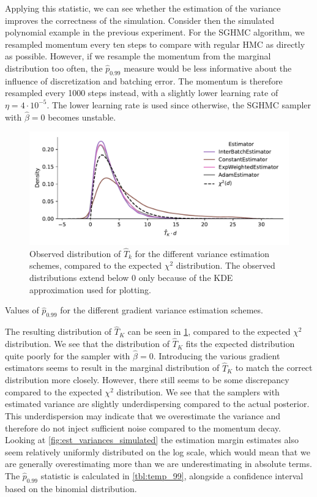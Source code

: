 Applying this statistic, we can see whether the estimation of the variance improves the correctness of the simulation. 
Consider then the simulated polynomial example in the previous experiment.
For the SGHMC algorithm, we resampled momentum every ten steps to compare with regular HMC as directly as possible. 
However, if we resample the momentum from the marginal distribution too often, the $\hat{p}_{0.99}$ measure would be less informative about the influence of discretization and batching error. 
The momentum is therefore resampled every 1000 steps instead, with a slightly lower learning rate of $\eta=4 \cdot 10^{-5}$.
The lower learning rate is used since otherwise, the SGHMC sampler with $\hat{\beta}=0$ becomes unstable. 
\begin{figure}[htbp]
    \centering
    \includegraphics[width=\linewidth]{Figures/temperature_sum_chi2_comp.pdf}
    \caption{Observed distribution of $\hat{T}_k$ for the different variance estimation schemes, compared to the expected $\chi^2$ distribution.
The observed distributions extend below 0 only because of the KDE approximation used for plotting.}
    \label{fig:temperature_sum_chi2_comp}
\end{figure}
\begin{table}[htbp]
    \centering
    
    \caption{Values of $\hat{p}_{0.99}$ for the different gradient variance estimation schemes.}
    \label{tbl:temp_99}
\end{table}
The resulting distribution of $\hat{T}_K$ can be seen in \cref{fig:temperature_sum_chi2_comp}, compared to the expected $\chi^2$ distribution. 
We see that the distribution of $\hat{T}_K$ fits the expected distribution quite poorly for the sampler with $\hat\beta=0$.
Introducing the various gradient estimators seems to result in the marginal distribution of $\hat{T}_K$ to match the correct distribution more closely.
However, there still seems to be some discrepancy compared to the expected $\chi^2$ distribution.
We see that the samplers with estimated variance are slightly underdispersing compared to the actual posterior. 
This underdispersion may indicate that we overestimate the variance and therefore do not inject sufficient noise compared to the momentum decay.
Looking at \cref{fig:est_variances_simulated} the estimation margin estimates also seem relatively uniformly distributed on the log scale, which would mean that we are generally overestimating more than we are underestimating in absolute terms.
The $\hat p_{0.99}$ statistic is calculated in \cref{tbl:temp_99}, alongside a confidence interval based on the binomial distribution.


